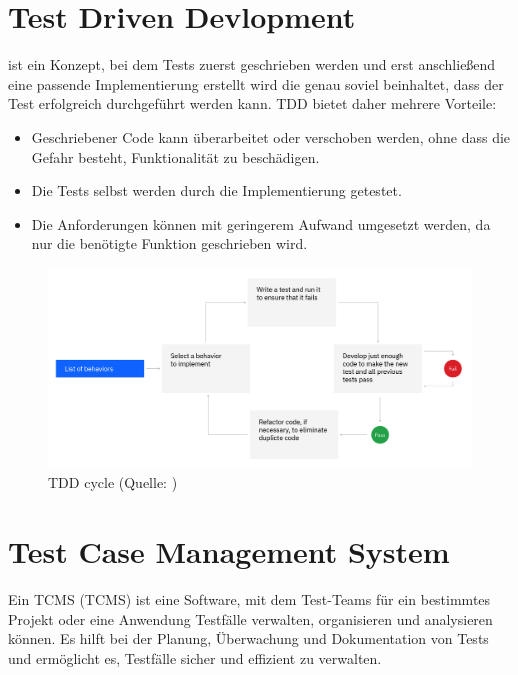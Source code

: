 \documentclass[a4paper, fontsize=11pt, parskip=half, twoside]{scrreprt}
\begin{document}
	
	\section{Test Driven Devlopment}
	 ist ein Konzept, bei dem Tests zuerst geschrieben werden und erst anschließend eine passende Implementierung erstellt wird die genau soviel beinhaltet, dass der Test erfolgreich durchgeführt werden kann.
	\ac{TDD} bietet daher mehrere Vorteile:
	
	\begin{itemize}
		\item Geschriebener Code kann überarbeitet oder verschoben werden, ohne dass die Gefahr besteht, Funktionalität zu beschädigen.
		\item Die Tests selbst werden durch die Implementierung getestet.
		\item Die Anforderungen können mit geringerem Aufwand umgesetzt werden, da nur die benötigte Funktion geschrieben wird.
	\end{itemize}

	\textcite{ammann_introduction_2016}
	
	\begin{figure}[ht]
		\centering
		\includegraphics[scale=0.25]{assets/tdd-cycle.png}
		\caption{\acl{TDD} cycle (Quelle: \textcite{noauthor_test-driven_nodate})}
		\label{fig:tdd-cycle}
	\end{figure}
	
	\section{Test Case Management System} \label{sec:tcms}
	Ein \acl{TCMS} (\ac{TCMS}) ist eine Software, mit dem Test-Teams für ein bestimmtes Projekt oder eine Anwendung Testfälle verwalten, organisieren und analysieren können.
	Es hilft bei der Planung, Überwachung und Dokumentation von Tests und ermöglicht es, Testfälle sicher und effizient zu verwalten.
	
\end{document}
